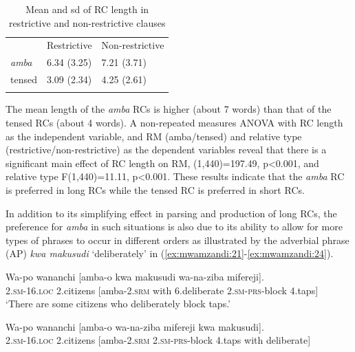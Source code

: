 \documentclass[output=paper,colorlinks,citecolor=brown]{langscibook}
\begin{document}
\begin{table}
    \begin{tabularx}{\textwidth}{XXX} & Restrictive & Non-restrictive\\
    \lsptoprule
    \textit{amba} & 6.34 (3.25) & 7.21 (3.71)\\
    tensed & 3.09 (2.34) & 4.25 (2.61)\\
    \lspbottomrule
    \end{tabularx}
    \caption{Mean and sd of RC length in restrictive and non-restrictive clauses}
    \label{tab:mwamzandi:1}
\end{table}

The mean length of the \textit{amba} RCs is higher (about 7 words) than that of the tensed RCs (about 4 words). A non-repeated measures ANOVA with RC length as the independent variable, and RM (amba/tensed) and relative type (restrictive/non-restrictive) as the dependent variables reveal that there is a significant main effect of RC length on RM, (1,440)=197.49, p<0.001, and relative type F(1,440)=11.11, p<0.001. These results indicate that the \textit{amba} RC is preferred in long RCs while the tensed RC is preferred in short RCs.

In addition to its simplifying effect in parsing and production of long RCs, the preference for \textit{amba} in such situations is also due to its ability to allow for more types of phrases to occur in different orders as illustrated by the adverbial phrase (AP) \textit{kwa makusudi} ‘deliberately’ in (\ref{ex:mwamzandi:21}-\ref{ex:mwamzandi:24}).

\ea%
    \label{ex:mwamzandi:21}
    \gll    Wa-po wananchi [amba-o kwa makusudi wa-na-ziba mifereji].\\
            \textsc{2.sm-16.loc} 2.citizens [amba\textsc{-2.srm} with 6.deliberate  \textsc{2.sm-prs-}block 4.taps]\\
    \glt    ‘There are some citizens who deliberately block taps.’
\z

\z

\ea%
    \label{ex:mwamzandi:23}
    \gll    Wa-po wananchi [amba-o wa-na-ziba mifereji kwa makusudi].\\
            \textsc{2.sm-16.loc} 2.citizens [amba\textsc{-2.srm} \textsc{2.sm-prs-}block  4.taps with deliberate]\\
\z
\end{document}
